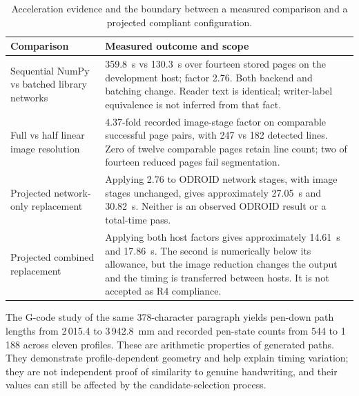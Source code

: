 \begin{table}[!htbp]\centering\small
\begin{tabularx}{\linewidth}{lX}\toprule
\textbf{Comparison} & \textbf{Measured outcome and scope}\\\midrule
Sequential NumPy vs batched library networks & 359.8~s vs 130.3~s over fourteen stored pages on the development host; factor 2.76. Both backend and batching change. Reader text is identical; writer-label equivalence is not inferred from that fact.\\[4pt]
Full vs half linear image resolution & 4.37-fold recorded image-stage factor on comparable successful page pairs, with 247 vs 182 detected lines. Zero of twelve comparable pages retain line count; two of fourteen reduced pages fail segmentation.\\[4pt]
Projected network-only replacement & Applying 2.76 to ODROID network stages, with image stages unchanged, gives approximately 27.05~s and 30.82~s. Neither is an observed ODROID result or a total-time pass.\\[4pt]
Projected combined replacement & Applying both host factors gives approximately 14.61~s and 17.86~s. The second is numerically below its allowance, but the image reduction changes the output and the timing is transferred between hosts. It is not accepted as R4 compliance.\\\bottomrule
\end{tabularx}
\caption{Acceleration evidence and the boundary between a measured comparison and a projected compliant configuration.}\label{tab:app-acceleration}\end{table}

The G-code study of the same 378-character paragraph yields pen-down path lengths from 2\,015.4 to 3\,942.8~mm and recorded pen-state counts from 544 to 1\,188 across eleven profiles. These are arithmetic properties of generated paths. They demonstrate profile-dependent geometry and help explain timing variation; they are not independent proof of similarity to genuine handwriting, and their values can still be affected by the candidate-selection process.

